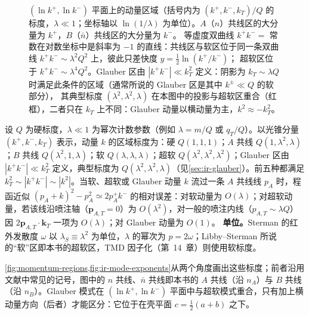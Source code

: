 \begin{figure}[htbp]
\caption{$(\ln k^+,\ln k^-)$ 平面上的动量区域（括号内为 $(k^+,k^-,k_T)/Q$ 的标度，$\lambda\ll1$；坐标轴以 $\ln(1/\lambda)$ 为单位）。$A$（$n$）共线区的大分量为 $k^+$，$B$（$\bar n$）共线区的大分量为 $k^-$。
等虚度双曲线 $k^+k^-=$ 常数在对数坐标中是斜率为 $-1$ 的直线：共线区与软区位于同一条双曲线 $k^+k^-\sim\lambda^2Q^2$ 上，彼此只差快度 $y=\frac12\ln(k^+/k^-)$；
超软区位于 $k^+k^-\sim\lambda^4Q^2$。Glauber 区由 $|k^+k^-|\ll k_T^2$ 定义：阴影为 $k_T\sim\lambda Q$ 时满足此条件的区域（通常所说的 Glauber 区是其中 $k^\pm\ll Q$ 的软部分），
其典型标度 $(\lambda^2,\lambda^2,\lambda)$ 在本图中的投影与超软区重合（红框），二者只在 $k_T$ 上不同：Glauber 动量以横动量为主，$k^2\approx-k_T^2$。}
\label{fig:momentum-regions}
\end{figure}

\begin{definition}[区域标度]\label{def:ir-scalings}
设 $Q$ 为硬标度，$\lambda\ll1$ 为幂次计数参数（例如 $\lambda=m/Q$ 或 $q_T/Q$）。以光锥分量 $(k^+,k^-,k_T)$ 表示，动量 $k$ 的区域标度为：硬 $Q(1,1,1)$；$A$ 共线 $Q(1,\lambda^2,\lambda)$；$B$ 共线 $Q(\lambda^2,1,\lambda)$；软 $Q(\lambda,\lambda,\lambda)$；超软 $Q(\lambda^2,\lambda^2,\lambda^2)$；Glauber 区由 $|k^+k^-|\ll k_T^2$ 定义，典型标度为 $Q(\lambda^2,\lambda^2,\lambda)$（见\cref{sec:ir-glauber}）。前五种都满足 $k_T^2\sim|k^+k^-|\sim|k^2|$。当软、超软或 Glauber 动量 $k$ 流过一条 $A$ 共线线 $p_A$ 时，程函近似 $(p_A+k)^2-p_A^2\simeq2p_A^+k^-$ 的相对误差：对软动量为 $O(\lambda)$；对超软动量，若该线沿喷注轴（$\mathbf p_{A,T}=0$）为 $O(\lambda^2)$，对一般的喷注内线（$p_{A,T}\sim\lambda Q$）因 $2\mathbf p_{A,T}\cdot\mathbf k_T$ 一项为 $O(\lambda)$；对 Glauber 动量为 $O(1)$。
\textbf{单位。}Sterman 的红外发散度 $\omega$ 以 $\lambda_S\equiv\lambda^2$ 为单位，$\lambda$ 的幂次为 $p=2\omega$；Libby--Sterman 所说的“软”区即本书的超软区，TMD 因子化（第~14~章）则使用软标度。
\end{definition}

\cref{fig:momentum-regions,fig:ir-mode-exponents}从两个角度画出这些标度；前者沿用文献中常见的记号，图中的 $n$ 共线、$\bar n$ 共线即本书的 $A$ 共线（沿 $n_A$）与 $B$ 共线（沿 $n_B$）。Glauber 模式在 $(\ln k^+,\ln k^-)$ 平面中与超软模式重合，只有加上横动量方向（后者）才能区分：它位于在壳平面 $c=\frac12(a+b)$ 之下。

